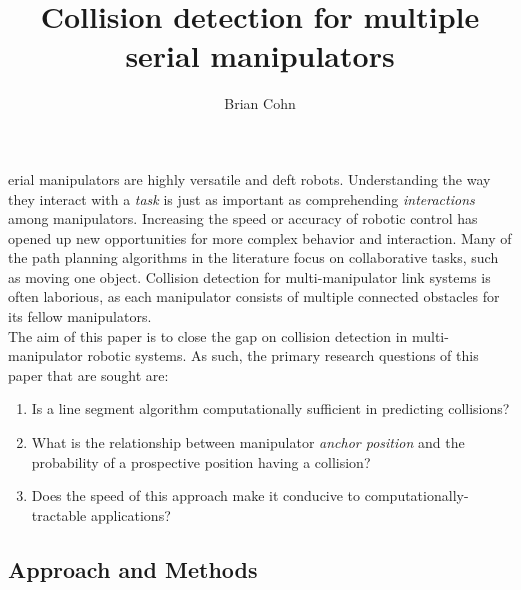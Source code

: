 \documentclass[9pt,twocolumn,twoside]{pnas-new}
\title{Collision detection for multiple serial manipulators}
\author[a,b,1]{Brian Cohn}
\affil[a]{University of Southern California, Department of Computer Science}
\affil[b]{brian.cohn@usc.edu}
\begin{document}
\verticaladjustment{-2pt}

\maketitle
\thispagestyle{firststyle}

erial manipulators are highly versatile and deft robots. Understanding the way they interact with a \textit{task} is just as important as comprehending \textit{interactions} among manipulators. Increasing the speed or accuracy of robotic control has opened up new opportunities for more complex behavior and interaction. Many of the path planning algorithms in the literature focus on collaborative tasks, such as moving one object. Collision detection for multi-manipulator link systems is often laborious, as each manipulator consists of multiple connected obstacles for its fellow manipulators.
\\
The aim of this paper is to close the gap on collision detection in multi-manipulator robotic systems. As such, the primary research questions of this paper that are sought are:
\begin{enumerate}
  \item Is a line segment algorithm computationally sufficient in predicting collisions?\\
  \item What is the relationship between manipulator \textit{anchor position} and the probability of a prospective position having a collision? \\
  \item Does the speed of this approach make it conducive to computationally-tractable applications?\\
\end{enumerate}

\subsection*{Approach and Methods}
\end{document}
